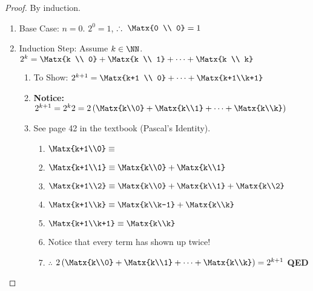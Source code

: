 \begin{proof}
By induction.
\begin{enumerate}
\item Base Case: $n=0$. $2^0 = 1$, $\therefore\ \Matx{0 \\ 0} = 1$ \checkmark
\item Induction Step: Assume $k \in \NN$. $2^k = \Matx{k \\ 0}+\Matx{k \\ 1}+\cdots+\Matx{k \\ k}$
	\begin{enumerate}
		\item To Show: $2^{k+1} = \Matx{k+1 \\ 0}+\cdots+\Matx{k+1\\k+1}$
		\item \textbf{Notice:} $2^{k+1} = 2^k2 = 2\left( \Matx{k\\0}+\Matx{k\\1}+\cdots+\Matx{k\\k}\right)$
		\item See page 42 in the textbook (Pascal's Identity).
		\begin{enumerate}
			\item $\Matx{k+1\\0} \equiv$
			\item $\Matx{k+1\\1} \equiv  \Matx{k\\0}+\Matx{k\\1}$
			\item $\Matx{k+1\\2} \equiv  \Matx{k\\0}+\Matx{k\\1}+\Matx{k\\2}$
			\item $\Matx{k+1\\k}\equiv   \Matx{k\\k-1}+\Matx{k\\k}$
			\item $\Matx{k+1\\k+1}\equiv \Matx{k\\k}$
			\item Notice that every term has shown up twice!
			\item $\therefore$ $2 \left( \Matx{k\\0}+\Matx{k\\1}+\cdots+\Matx{k\\k} \right) = 2^{k+1}$ \textbf{QED}
		\end{enumerate}
	\end{enumerate}
\end{enumerate}
\end{proof}
